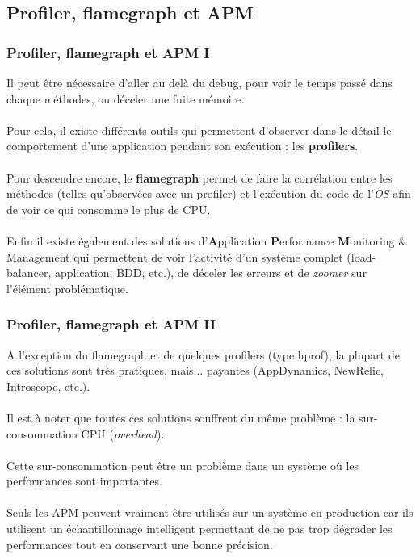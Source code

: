 \subsection{Profiler, flamegraph et APM}
\begin{frame}
	\frametitle{Profiler, flamegraph et APM I}
    Il peut \^{e}tre n\'{e}cessaire d'aller au del\`{a} du debug, pour voir le temps pass\'{e} dans chaque m\'{e}thodes, ou d\'{e}celer une fuite m\'{e}moire.
    \\~\\
    Pour cela, il existe diff\'{e}rents outils qui permettent d'observer dans le d\'{e}tail le comportement d'une application pendant son ex\'{e}cution : les \textbf{profilers}.
    \\~\\
    Pour descendre encore, le \textbf{flamegraph} permet de faire la corr\'{e}lation entre les m\'{e}thodes (telles qu'observ\'{e}es avec un profiler) et l'ex\'{e}cution du code de l'\textit{OS} afin de voir ce qui consomme le plus de CPU.
    \\~\\
    Enfin il existe \'{e}galement des solutions d'\textbf{A}pplication \textbf{P}erformance \textbf{M}onitoring \& Management qui permettent de voir l'activit\'{e} d'un syst\`{e}me complet (load-balancer, application, BDD, etc.), de d\'{e}celer les erreurs et de \textit{zoomer} sur l\'{}\'{e}l\'{e}ment probl\'{e}matique.    
\end{frame}

\begin{frame}
	\frametitle{Profiler, flamegraph et APM II}
    A l'exception du flamegraph et de quelques profilers (type hprof), la plupart de ces solutions sont tr\`{e}s pratiques, mais... payantes (AppDynamics, NewRelic, Introscope, etc.).
    \\~\\
    Il est \`{a} noter que toutes ces solutions souffrent du m\^{e}me probl\`{e}me : la sur-consommation CPU (\textit{overhead}).
    \\~\\
    Cette sur-consommation peut \^{e}tre un probl\`{e}me dans un syst\`{e}me o\`{u} les performances sont importantes.
    \\~\\ Seuls les APM peuvent vraiment \^{e}tre utilis\'{e}s sur un syst\`{e}me en production car ils utilisent un \'{e}chantillonnage intelligent permettant de ne pas trop d\'{e}grader les performances tout en conservant une bonne pr\'{e}cision.
\end{frame}
